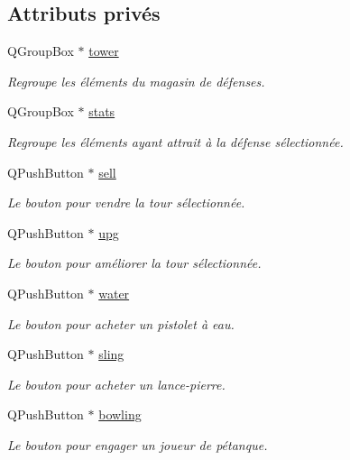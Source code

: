 \subsection*{Attributs privés}
\begin{DoxyCompactItemize}
\item 
QGroupBox $\ast$ \hyperlink{classUI_a352f80a494c8d3c1723f1248438ea912}{tower}
\begin{DoxyCompactList}\small\item\em Regroupe les éléments du magasin de défenses. \end{DoxyCompactList}\item 
QGroupBox $\ast$ \hyperlink{classUI_a04ffefe0b9ef54d2ebc76595b00bb900}{stats}
\begin{DoxyCompactList}\small\item\em Regroupe les éléments ayant attrait à la défense sélectionnée. \end{DoxyCompactList}\item 
QPushButton $\ast$ \hyperlink{classUI_a4e35fb65ac2aa948adb7f7b9eb94d5c2}{sell}
\begin{DoxyCompactList}\small\item\em Le bouton pour vendre la tour sélectionnée. \end{DoxyCompactList}\item 
QPushButton $\ast$ \hyperlink{classUI_abf5a7181f1e80c8873cfae97be8e8b4f}{upg}
\begin{DoxyCompactList}\small\item\em Le bouton pour améliorer la tour sélectionnée. \end{DoxyCompactList}\item 
QPushButton $\ast$ \hyperlink{classUI_aaa5e1351929c7da7d4ae82ddbc31c77b}{water}
\begin{DoxyCompactList}\small\item\em Le bouton pour acheter un pistolet à eau. \end{DoxyCompactList}\item 
QPushButton $\ast$ \hyperlink{classUI_af645e28743002610e25ce8542dcb1a8e}{sling}
\begin{DoxyCompactList}\small\item\em Le bouton pour acheter un lance-\/pierre. \end{DoxyCompactList}\item 
QPushButton $\ast$ \hyperlink{classUI_a8279bd03cdee4ab01f04152f2ea7a906}{bowling}
\begin{DoxyCompactList}\small\item\em Le bouton pour engager un joueur de pétanque. \end{DoxyCompactList}\item 

\end{DoxyCompactItemize}
